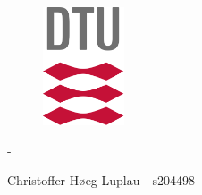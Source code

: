 \begin{titlepage}
  \begin{figure}[h]
    \begin{flushright}
      \includegraphics[height=3.5cm]{figures/dtu-logo.png}\\
    \end{flushright}
  \end{figure}

  \centering \parindent=0pt

  \huge
  { \bf \mytitle}

  \large \mycourseno{} - \mycourse

  \vspace{2cm}
  Christoffer Høeg Luplau - s204498 \\


  \begin{flushleft}
    \vspace*{\fill}
    \normalsize
    \myschool   \\
    \mydate     \\
  \end{flushleft}
\end{titlepage}